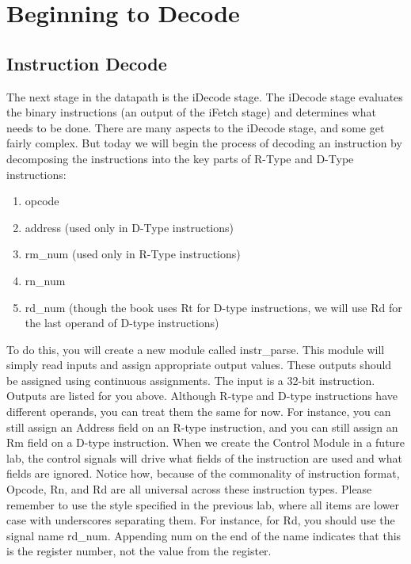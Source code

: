 \chapter{Beginning to Decode}

\section{Instruction Decode}

The next stage in the datapath is the iDecode stage.  The iDecode stage evaluates the binary instructions (an output of the iFetch stage) and determines what needs to be done.  There are many aspects to the iDecode stage, and some get fairly complex.  But today we will begin the process of decoding an instruction by decomposing the instructions into the key parts of R-Type and D-Type instructions:
\begin{enumerate}
	\item opcode
	\item address (used only in D-Type instructions)
	\item rm\_num (used only in R-Type instructions)
	\item rn\_num
	\item rd\_num (though the book uses Rt for D-type instructions, we will use Rd for the last operand of D-type instructions)
\end{enumerate}   

To do this, you will create a new module called instr\_parse.  This module will simply read inputs and assign appropriate output values.  These outputs should be assigned using continuous assignments.  The input is a 32-bit instruction.  Outputs are listed for you above.  Although R-type and D-type instructions have different operands, you can treat them the same for now.  For instance, you can still assign an Address field on an R-type instruction, and you can still assign an Rm field on a D-type instruction.  When we create the Control Module in a future lab, the control signals will drive what fields of the instruction are used and what fields are ignored.  Notice how, because of the commonality of instruction format, Opcode, Rn, and Rd are all universal across these instruction types.  Please remember to use the style specified in the previous lab, where all items are lower case with underscores separating them.  For instance, for Rd, you should use the signal name rd\_num.  Appending num on the end of the name indicates that this is the register number, not the value from the register.


